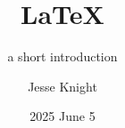 \title[\LaTeX: a short introduction]{\LaTeX}
\subtitle{a short introduction}
\author{Jesse Knight}
\date{2025 June 5}
